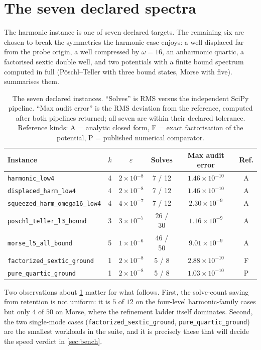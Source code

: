 \documentclass[twocolumn,10pt,a4paper]{article}
\theoremstyle{plain}
\theoremstyle{definition}
\newcommand{\eps}{\varepsilon}
\begin{document}
\section{The seven declared spectra}
\label{sec:suite}

The harmonic instance is one of seven declared targets. The remaining six are
chosen to break the symmetries the harmonic case enjoys: a well displaced far
from the probe origin, a well compressed by $\omega = 16$, an anharmonic
quartic, a factorised sextic double well, and two potentials with a finite bound
spectrum computed in full (P\"oschl--Teller with three bound states, Morse with
five).  summarises them.

\begin{table}[t]
\centering\small
\caption{The seven declared instances. ``Solves'' is RMS versus the independent
SciPy pipeline. ``Max audit error'' is the RMS deviation from the reference,
computed after both pipelines returned; all seven are within their declared
tolerance. Reference kinds: A = analytic closed form, F = exact factorisation of
the potential, P = published numerical comparator.}
\label{tab:suite}
\begin{tabular}{lccccc}
\toprule
Instance & $k$ & $\eps$ & Solves & Max audit error & Ref. \\
\midrule
\texttt{harmonic\_low4}          & 4 & $2\times10^{-8}$ & 7 / 12  & $1.46\times10^{-10}$ & A\\
\texttt{displaced\_harm\_low4} & 4 & $2\times10^{-8}$ & 7 / 12  & $1.46\times10^{-10}$ & A\\
\texttt{squeezed\_harm\_omega16\_low4} & 4 & $4\times10^{-7}$ & 7 / 12 & $2.30\times10^{-9}$ & A\\
\texttt{poschl\_teller\_l3\_bound} & 3 & $3\times10^{-7}$ & 26 / 30 & $1.16\times10^{-9}$ & A\\
\texttt{morse\_l5\_all\_bound} & 5 & $1\times10^{-6}$ & 46 / 50 & $9.01\times10^{-9}$ & A\\
\texttt{factorized\_sextic\_ground} & 1 & $2\times10^{-8}$ & 5 / 8 & $2.88\times10^{-10}$ & F\\
\texttt{pure\_quartic\_ground}      & 1 & $2\times10^{-8}$ & 5 / 8 & $1.03\times10^{-10}$ & P\\
\bottomrule
\end{tabular}
\end{table}

Two observations about \cref{tab:suite} matter for what follows. First, the
solve-count saving from retention is not uniform: it is $5$ of $12$ on the
four-level harmonic-family cases but only $4$ of $50$ on Morse, where the
refinement ladder itself dominates. Second, the two single-mode cases
(\texttt{factorized\_sextic\_ground}, \texttt{pure\_quartic\_ground}) are the
smallest workloads in the suite, and it is precisely these that will decide the
speed verdict in \cref{sec:bench}.
\end{document}
